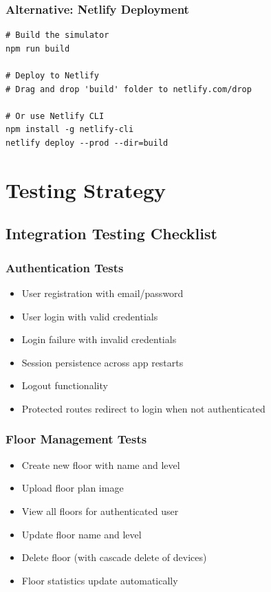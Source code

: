 \documentclass[12pt,a4paper]{article}
\begin{document}
\subsubsection{Alternative: Netlify Deployment}
\begin{verbatim}
# Build the simulator
npm run build

# Deploy to Netlify
# Drag and drop 'build' folder to netlify.com/drop

# Or use Netlify CLI
npm install -g netlify-cli
netlify deploy --prod --dir=build
\end{verbatim}


\newpage
\section{Testing Strategy}

\subsection{Integration Testing Checklist}

\subsubsection{Authentication Tests}
\begin{itemize}[leftmargin=*]
    \item[$\square$] User registration with email/password
    \item[$\square$] User login with valid credentials
    \item[$\square$] Login failure with invalid credentials
    \item[$\square$] Session persistence across app restarts
    \item[$\square$] Logout functionality
    \item[$\square$] Protected routes redirect to login when not authenticated
\end{itemize}

\subsubsection{Floor Management Tests}
\begin{itemize}[leftmargin=*]
    \item[$\square$] Create new floor with name and level
    \item[$\square$] Upload floor plan image
    \item[$\square$] View all floors for authenticated user
    \item[$\square$] Update floor name and level
    \item[$\square$] Delete floor (with cascade delete of devices)
    \item[$\square$] Floor statistics update automatically
\end{itemize}
\end{document}
